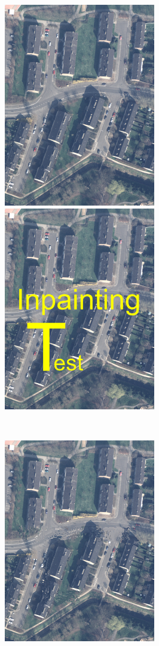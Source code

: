 \documentclass[titlepage]{article}
\begin{document}
\begin{figure}[H]
  \centering
  \begin{minipage}{\textwidth}
    \centering
    \captionsetup{justification=centering}
    \includegraphics[width=.4\textwidth]{houses}\quad
    \includegraphics[width=.4\textwidth]{houses_text}
  \end{minipage}\\[1em]
  \begin{minipage}{\textwidth}
    \centering
    \captionsetup{justification=centering}
    \includegraphics[width=.4\textwidth]{houses_clean_16_inpainted}\quad

\end{minipage}
\end{figure}
\end{document}
